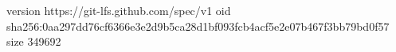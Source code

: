 version https://git-lfs.github.com/spec/v1
oid sha256:0aa297dd76cf6366e3e2d9b5ca28d1bf093fcb4acf5e2e07b467f3bb79bd0f57
size 349692
